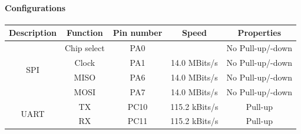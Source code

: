 \paragraph{Configurations}

\begin{center}
	\begin{tabular}{ |c|c|c|c|c| } 
		\hline
		Description & Function &Pin number & Speed& Properties \\
		\hline
		\multirow{4}{4em}{SPI} 	& Chip select & PA0& &No Pull-up/-down \\ 
								& Clock& PA1 & 14.0 MBits/s&No Pull-up/-down \\ 
								& MISO & PA6&14.0 MBits/s & No Pull-up/-down  \\ 
								& MOSI & PA7& 14.0 MBits/s&No Pull-up/-down  \\ 
		\hline
		\multirow{2}{4em}{UART} & TX & PC10 & 115.2 kBits/s & Pull-up   \\ 
								& RX & PC11 & 115.2 kBits/s & Pull-up \\ 
	\hline
	\end{tabular}
\end{center}
